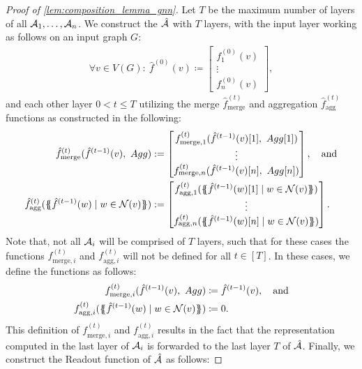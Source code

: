 \begin{proof}[Proof of \cref{lem:composition_lemma_gnn}]
    Let $T$ be the maximum number of layers of all $\mathcal{A}_1, \dots, \mathcal{A}_n$. We construct the \gnn $\hat{\mathcal{A}}$ with $T$ layers, with the input layer working as follows on an input graph $G$:
    \begin{align*}
        \forall v \in V(G): \ \hat{f}^{(0)}(v) \coloneqq \begin{bmatrix}
            f^{(0)}_1(v)\\
            \vdots\\
            f^{(0)}_n(v)
        \end{bmatrix},
    \end{align*}
    and each other layer $0 < t \leq T$ utilizing the merge $\hat{f}^{(t)}_{\text{merge}}$ and aggregation $\hat{f}^{(t)}_{\text{agg}}$ functions as constructed in the following:
    \begin{align*}
        \hat{f}^{(t)}_{\text{merge}} (\hat{f}^{(t-1)}(v), \ Agg) &:= \begin{bmatrix}
            f^{(t)}_{\text{merge}, 1}(\hat{f}^{(t-1)}(v)[1],\ Agg[1])\\
            \vdots\\
            f^{(t)}_{\text{merge}, n}(\hat{f}^{(t-1)}(v)[n],\ Agg[n])
        \end{bmatrix},\quad \text{and}\\
        \hat{f}^{(t)}_{\text{agg}}(\MSopen \hat{f}^{(t-1)}(w) \mid w \in \mathcal{N}(v) \MSclose ) &:= \begin{bmatrix}
            f^{(t)}_{\text{agg}, 1}(\MSopen \hat{f}^{(t-1)}(w)[1] \mid w \in \mathcal{N}(v) \MSclose)\\
            \vdots\\
            f^{(t)}_{\text{agg}, n}(\MSopen \hat{f}^{(t-1)}(w)[n] \mid w \in \mathcal{N}(v) \MSclose)
        \end{bmatrix}.
    \end{align*}
    Note that, not all $\mathcal{A}_i$ will be comprised of $T$ layers, such that for these cases the functions $f^{(t)}_{\text{merge}, i}$ and $f^{(t)}_{\text{agg}, i}$ will not be defined for all $t \in [T]$. In these cases, we define the functions as follows:
    \begin{align*}
        f^{(t)}_{\text{merge}, i}(\hat{f}^{(t-1)}(v), \ Agg) &\coloneqq \hat{f}^{(t-1)}(v), \quad \text{and}\\
        f^{(t)}_{\text{agg}, i}(\{\!\!\{ \hat{f}^{(t-1)}(w) \mid w \in \mathcal{N}(v) \}\!\!\}) &\coloneqq 0.
    \end{align*}
    This definition of $f^{(t)}_{\text{merge}, i}$ and $f^{(t)}_{\text{agg}, i}$ results in the fact that the representation computed in the last layer of $\mathcal{A}_i$ is forwarded to the last layer $T$ of $\hat{\mathcal{A}}$. Finally, we construct the \textsf{Readout} function of $\hat{\mathcal{A}}$ as follows:

\end{proof}
